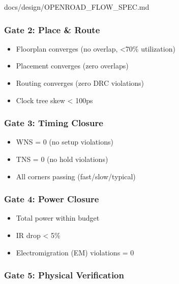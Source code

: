 \begin{relocated}{docs/design/OPENROAD_FLOW_SPEC.md}
\subsubsection{Gate 2: Place \& Route}\label{tm:pd:openroad-flow:gate-2-place-route}

\begin{itemize}
\tightlist
\item[$\boxtimes$]
  Floorplan converges (no overlap, \textless70\% utilization)
\item[$\boxtimes$]
  Placement converges (zero overlaps)
\item[$\boxtimes$]
  Routing converges (zero DRC violations)
\item[$\boxtimes$]
  Clock tree skew \textless{} 100ps
\end{itemize}

\subsubsection{Gate 3: Timing Closure}\label{tm:pd:openroad-flow:gate-3-timing-closure}

\begin{itemize}
\tightlist
\item[$\boxtimes$]
  WNS = 0 (no setup violations)
\item[$\boxtimes$]
  TNS = 0 (no hold violations)
\item[$\boxtimes$]
  All corners passing (fast/\allowbreak{}slow/\allowbreak{}typical)
\end{itemize}

\subsubsection{Gate 4: Power Closure}\label{tm:pd:openroad-flow:gate-4-power-closure}

\begin{itemize}
\tightlist
\item[$\boxtimes$]
  Total power within budget
\item[$\boxtimes$]
  IR drop \textless{} 5\%
\item[$\boxtimes$]
  Electromigration (EM) violations = 0
\end{itemize}

\subsubsection{Gate 5: Physical Verification}\label{tm:pd:openroad-flow:gate-5-physical-verification}


\end{relocated}
